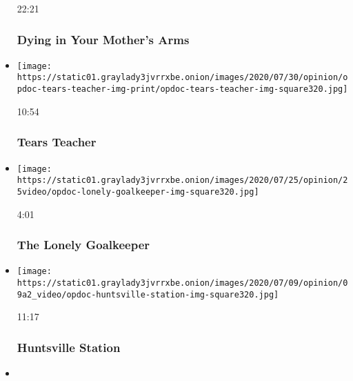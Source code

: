 \begin{itemize}
  22:21

  \hypertarget{dying-in-your-mothers-arms}{%
  \subsubsection{Dying in Your Mother's
  Arms}\label{dying-in-your-mothers-arms}}
\item
  \href{https://www.nytimes3xbfgragh.onion/video/opinion/100000007247238/tears-teacher.html?action=click\&module=video-series-bar\&region=header\&pgtype=Article\&playlistId=video/op-docs}{}

  \texttt{[image: https://static01.graylady3jvrrxbe.onion/images/2020/07/30/opinion/opdoc-tears-teacher-img-print/opdoc-tears-teacher-img-square320.jpg]}

  10:54

  \hypertarget{tears-teacher}{%
  \subsubsection{Tears Teacher}\label{tears-teacher}}
\item
  \href{https://www.nytimes3xbfgragh.onion/video/opinion/100000007229285/the-lonely-goalkeeper.html?action=click\&module=video-series-bar\&region=header\&pgtype=Article\&playlistId=video/op-docs}{}

  \texttt{[image: https://static01.graylady3jvrrxbe.onion/images/2020/07/25/opinion/25video/opdoc-lonely-goalkeeper-img-square320.jpg]}

  4:01

  \hypertarget{the-lonely-goalkeeper}{%
  \subsubsection{The Lonely Goalkeeper}\label{the-lonely-goalkeeper}}
\item
  \href{https://www.nytimes3xbfgragh.onion/video/opinion/100000007080462/huntsville-station.html?action=click\&module=video-series-bar\&region=header\&pgtype=Article\&playlistId=video/op-docs}{}

  \texttt{[image: https://static01.graylady3jvrrxbe.onion/images/2020/07/09/opinion/09a2\_video/opdoc-huntsville-station-img-square320.jpg]}

  11:17

  \hypertarget{huntsville-station}{%
  \subsubsection{Huntsville Station}\label{huntsville-station}}
\item
  \href{https://www.nytimes3xbfgragh.onion/video/opinion/100000007205588/the-torture-letters.html?action=click\&module=video-series-bar\&region=header\&pgtype=Article\&playlistId=video/op-docs}{}


\end{itemize}

